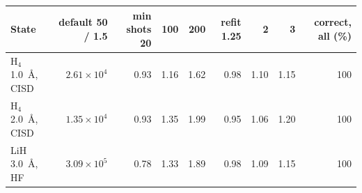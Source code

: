 \begin{tabular}{@{}lrrrrrrrr@{}}
\toprule
State & default 50 / 1.5 & min shots 20 & 100 & 200 & refit 1.25 & 2 & 3 & correct, all (\%) \\
\midrule
H$_4$ 1.0~\AA, CISD & $2.61\times10^{4}$ & 0.93 & 1.16 & 1.62 & 0.98 & 1.10 & 1.15 & 100 \\
H$_4$ 2.0~\AA, CISD & $1.35\times10^{4}$ & 0.93 & 1.35 & 1.99 & 0.95 & 1.06 & 1.20 & 100 \\
LiH 3.0~\AA, HF & $3.09\times10^{5}$ & 0.78 & 1.33 & 1.89 & 0.98 & 1.09 & 1.15 & 100 \\
\bottomrule
\end{tabular}
